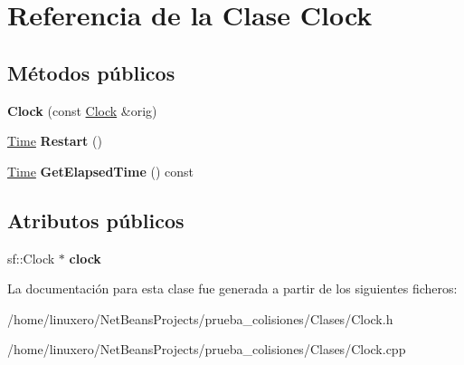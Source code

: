 \hypertarget{classClock}{\section{Referencia de la Clase Clock}
\label{classClock}
}
\subsection*{Métodos públicos}
\begin{DoxyCompactItemize}
\item 
\hypertarget{classClock_a5a33622744878d233352e2ddde5acf98}{{\bfseries Clock} (const \hyperlink{classClock}{Clock} \&orig)}\label{classClock_a5a33622744878d233352e2ddde5acf98}

\item 
\hypertarget{classClock_a5909f7677c453f589ef109c5e30251ab}{\hyperlink{classTime}{Time} {\bfseries Restart} ()}\label{classClock_a5909f7677c453f589ef109c5e30251ab}

\item 
\hypertarget{classClock_aca8f3ca2f9b36eb348217747b4413484}{\hyperlink{classTime}{Time} {\bfseries Get\-Elapsed\-Time} () const }\label{classClock_aca8f3ca2f9b36eb348217747b4413484}

\end{DoxyCompactItemize}
\subsection*{Atributos públicos}
\begin{DoxyCompactItemize}
\item 
\hypertarget{classClock_adff8b3a1419c696ec7e98fd2499ea6ef}{sf\-::\-Clock $\ast$ {\bfseries clock}}\label{classClock_adff8b3a1419c696ec7e98fd2499ea6ef}

\end{DoxyCompactItemize}


La documentación para esta clase fue generada a partir de los siguientes ficheros\-:\begin{DoxyCompactItemize}
\item 
/home/linuxero/\-Net\-Beans\-Projects/prueba\-\_\-colisiones/\-Clases/Clock.\-h\item 
/home/linuxero/\-Net\-Beans\-Projects/prueba\-\_\-colisiones/\-Clases/Clock.\-cpp\end{DoxyCompactItemize}
